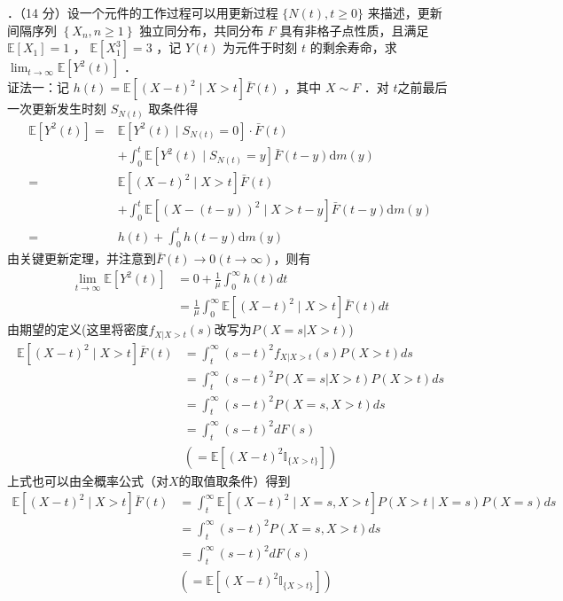 \documentclass[UTF8,openany]{book}
\begin{document}
．（14 分）设一个元件的工作过程可以用更新过程 $\{N(t), t \geq 0\}$ 来描述，更新间隔序列 $\left\{X_{n}, n \geq 1\right\}$ 独立同分布，共同分布 $F$ 具有非格子点性质，且满足 $\mathbb{E}\left[X_{1}\right]=1$ ， $\mathbb{E}\left[X_{1}^{3}\right]=3$ ，记 $Y(t)$ 为元件于时刻 $t$ 的剩余寿命，求 $\lim _{t \rightarrow \infty} {\mathbb{E}}\left[Y^{2}(t)\right]$ ．\\
证法一：记 $h(t)=\mathbb{E}\left[(X-t)^{2}\mid X>t\right]\bar{F}(t)$ ，其中 $X \sim F$ ．对 $t$之前最后一次更新发生时刻 $S_{N(t)}$ 取条件得
$$
\begin{aligned}
	\mathbb{E}\left[Y^{2}(t)\right]= & \mathbb{E}\left[Y^{2}(t) \mid S_{N(t)}=0\right] \cdot \bar{F}(t) \\
	& +\int_{0}^{t} \mathbb{E}\left[Y^{2}(t) \mid S_{N(t)}=y\right] \bar{F}(t-y) \mathrm{d} m(y) \\
	= & \mathbb{E}\left[(X-t)^{2} \mid X>t\right] \bar{F}(t) \\
	& +\int_{0}^{t} \mathbb{E}\left[(X-(t-y))^{2} \mid X>t-y\right] \bar{F}(t-y) \mathrm{d} m(y) \\
	= & h(t)+\int_{0}^{t} h(t-y) \mathrm{d} m(y) 
\end{aligned}
$$
由关键更新定理，并注意到$\bar{F}(t)\rightarrow 0 (t\rightarrow \infty)$，则有
$$
\begin{aligned}
	\lim _{t \rightarrow \infty} {\mathbb{E}}\left[Y^{2}(t)\right]&=0+\frac{1}{\mu}\int_{0}^{\infty}h(t)dt\\
	&=\frac{1}{\mu}\int_{0}^{\infty} \mathbb{E}\left[(X-t)^2\mid X >t\right]\bar{F}(t)dt 
\end{aligned}
$$
由期望的定义(这里将密度$f_{X|X>t}(s)$改写为$P(X=s|X>t)$)
\begin{align*}
	\mathbb{E}\left[(X-t)^2\mid X >t\right]\bar{F}(t) &
	=\int_{t}^{\infty} (s-t)^2 f_{X|X>t}(s)P(X>t)ds  \\ &=\int_{t}^{\infty} (s-t)^2 P(X=s|X>t)P(X>t)ds  \\
	& = \int_{t}^{\infty} (s-t)^2 P(X=s , X>t)ds  \\
	& = \int_{t}^{\infty}  (s-t)^2 dF(s)\\
	&\left( =\mathbb{E}\left[(X-t)^2 \mathbb{I}_{\{X >t\}}\right]\right) 
\end{align*}
上式也可以由全概率公式（对$X$的取值取条件）得到
\begin{align*}
	\mathbb{E}\left[(X-t)^2\mid X >t\right]\bar{F}(t) & =\int_{t}^{\infty} \mathbb{E}\left[(X-t)^2 \mid X=s,X>t \right] P(X>t \mid X=s)P(X=s)ds  \\
	& = \int_{t}^{\infty} (s-t)^2 P(X=s , X>t)ds  \\
	& = \int_{t}^{\infty}  (s-t)^2 dF(s)\\
	&\left( =\mathbb{E}\left[(X-t)^2 \mathbb{I}_{\{X >t\}}\right]\right) 
\end{align*}
\end{document}
